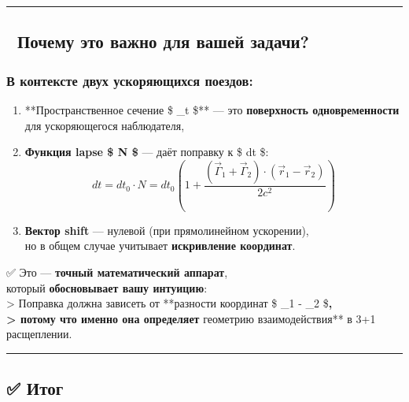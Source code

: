 \documentclass[11pt]{article}
\providecommand{\tightlist}{%
      \setlength{\itemsep}{0pt}\setlength{\parskip}{0pt}}
\begin{document}
\begin{center}\rule{0.5\linewidth}{\linethickness}\end{center}

\subsection{🔁 Почему это важно для вашей
задачи?}\label{ux43fux43eux447ux435ux43cux443-ux44dux442ux43e-ux432ux430ux436ux43dux43e-ux434ux43bux44f-ux432ux430ux448ux435ux439-ux437ux430ux434ux430ux447ux438}

\subsubsection{В контексте двух ускоряющихся
поездов:}\label{ux432-ux43aux43eux43dux442ux435ux43aux441ux442ux435-ux434ux432ux443ux445-ux443ux441ux43aux43eux440ux44fux44eux449ux438ux445ux441ux44f-ux43fux43eux435ux437ux434ux43eux432}

\begin{enumerate}
\def\labelenumi{\arabic{enumi}.}
\tightlist
\item
  **Пространственное сечение \$ \Sigma\_t \$** --- это
  \textbf{поверхность одновременности} для ускоряющегося наблюдателя,
\item
  \textbf{Функция lapse \$ N \$} --- даёт поправку к \$ dt \$:\\
  \[
     dt = dt_0 \cdot N = dt_0 \left( 1 + \frac{(\vec{\Gamma}_1 + \vec{\Gamma}_2) \cdot (\vec{r}_1 - \vec{r}_2)}{2c^2} \right)
     \]
\item
  \textbf{Вектор shift} --- нулевой (при прямолинейном ускорении),\\
  но в общем случае учитывает \textbf{искривление координат}.
\end{enumerate}

✅ Это --- \textbf{точный математический аппарат},\\
который \textbf{обосновывает вашу интуицию}:\\
\textgreater{} Поправка должна зависеть от **разности координат \$
\_1 - \_2 \$\textbf{,\\
\textgreater{} потому что именно она определяет }геометрию
взаимодействия** в 3+1 расщеплении.

\begin{center}\rule{0.5\linewidth}{\linethickness}\end{center}

\subsection{✅ Итог}\label{ux438ux442ux43eux433-1}
\end{document}
